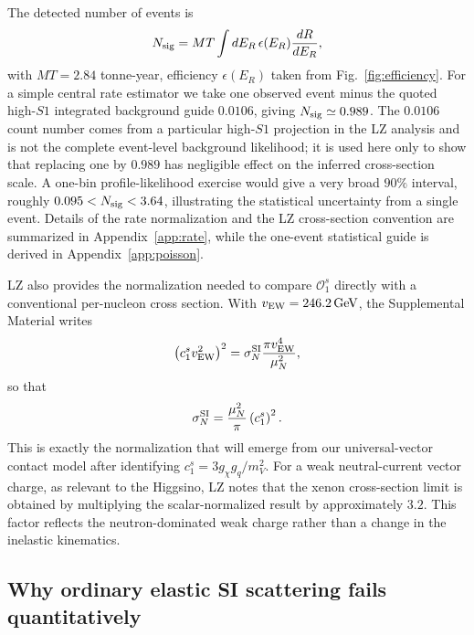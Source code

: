 \documentclass[aps,prd,reprint,superscriptaddress,nofootinbib,longbibliography,floatfix]{revtex4-2}
\newcommand{\er}{E_{R}}
\newcommand{\GeV}{\mathrm{GeV}}
\begin{document}
The detected number of events is
\begin{equation}
N_{\rm sig}=MT\int d\er\,\epsilon(\er)\frac{dR}{d\er},
\label{eq:nsig}
\end{equation}
with $MT=2.84$ tonne-year, efficiency $\epsilon(E_R)$ taken from Fig.~\ref{fig:efficiency}. For a simple central rate estimator we take one observed event minus the quoted high-$S1$ integrated background guide $0.0106$, giving $N_{\rm sig}\simeq0.989$. The $0.0106$ count number comes from a particular high-$S1$ projection in the LZ analysis and is not the complete event-level background likelihood; it is used here only to show that replacing one by $0.989$ has negligible effect on the inferred cross-section scale. A one-bin profile-likelihood exercise would give a very broad $90\%$ interval, roughly $0.095<N_{\rm sig}<3.64$, illustrating the statistical uncertainty from a single event. Details of the rate normalization and the LZ cross-section convention are summarized in Appendix~\ref{app:rate}, while the one-event statistical guide is derived in Appendix~\ref{app:poisson}.


LZ also provides the normalization needed to compare $\mathcal{O}_1^s$ directly with a conventional per-nucleon cross section. With $v_{\rm EW}=246.2\,\GeV$, the Supplemental Material writes
\begin{equation}
\left(c_1^s v_{\rm EW}^2\right)^2
=\sigma_N^{\rm SI}\frac{\pi v_{\rm EW}^4}{\mu_N^2},
\label{eq:lzo1conversion}
\end{equation}
so that
\begin{equation}
\sigma_N^{\rm SI}=\frac{\mu_N^2}{\pi}\left(c_1^s\right)^2.
\label{eq:lzo1conversion2}
\end{equation}
This is exactly the normalization that will emerge from our universal-vector contact model after identifying $c_1^s=3g_\chi g_q/m_V^2$. For a weak neutral-current vector charge, as relevant to the Higgsino, LZ notes that the xenon cross-section limit is obtained by multiplying the scalar-normalized result by approximately $3.2$. This factor reflects the neutron-dominated weak charge rather than a change in the inelastic kinematics.




\subsection{Why ordinary elastic SI scattering fails quantitatively}
\label{sec:elasticSInogo}
\end{document}
